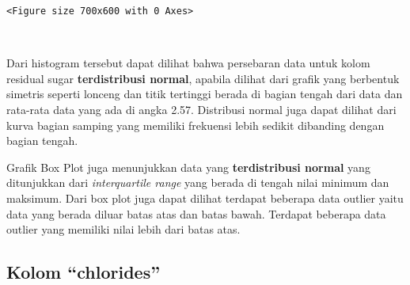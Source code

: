 \documentclass[11pt]{article}
\begin{document}
    
    \begin{Verbatim}[commandchars=\\\{\}]
<Figure size 700x600 with 0 Axes>
    \end{Verbatim}

    
    \begin{center}
    \end{center}
    { \hspace*{\fill} \\}
    
    Dari histogram tersebut dapat dilihat bahwa persebaran data untuk kolom
residual sugar \textbf{terdistribusi normal}, apabila dilihat dari
grafik yang berbentuk simetris seperti lonceng dan titik tertinggi
berada di bagian tengah dari data dan rata-rata data yang ada di angka
2.57. Distribusi normal juga dapat dilihat dari kurva bagian samping
yang memiliki frekuensi lebih sedikit dibanding dengan bagian tengah.

Grafik Box Plot juga menunjukkan data yang \textbf{terdistribusi normal}
yang ditunjukkan dari \emph{interquartile range} yang berada di tengah
nilai minimum dan maksimum. Dari box plot juga dapat dilihat terdapat
beberapa data outlier yaitu data yang berada diluar batas atas dan batas
bawah. Terdapat beberapa data outlier yang memiliki nilai lebih dari
batas atas.

    \hypertarget{kolom-chlorides}{%
\subsection{Kolom ``chlorides''}\label{kolom-chlorides}}
\end{document}
